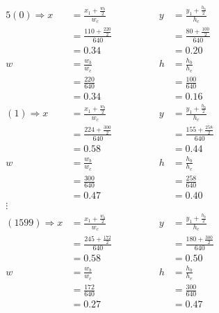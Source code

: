     \begin{alignat*}{5}
        (0) \Rightarrow x       &= \frac{x_1 + \frac{w_b}{2}}{w_c} \qquad\qquad &y  &=\frac{y_1 + \frac{h_b}{2}}{h_c}\\
                                &= \frac{110 + \frac{220}{2}}{640} \qquad\qquad &   &=\frac{80 + \frac{100}{2}}{640}\\
                                &= 0.34 \qquad\qquad                            &   &= 0.20\\
        w                       &= \frac{w_b}{w_c}\qquad\qquad                  &h  &= \frac{h_b}{h_c}\\
                                &= \frac{220}{640}\qquad\qquad                  &   &= \frac{100}{640}\\
                                &= 0.34\qquad\qquad                             &   &= 0.16\\
        (1) \Rightarrow x       &= \frac{x_1 + \frac{w_b}{2}}{w_c}\qquad\qquad  &y  &=\frac{y_1 + \frac{h_b}{2}}{h_c}\\
                                &= \frac{224 + \frac{300}{2}}{640}\qquad\qquad  &   &= \frac{155 + \frac{258}{2}}{640}\\
                                &= 0.58\qquad\qquad                             &   &= 0.44\\
        w                       &= \frac{w_b}{w_c}\qquad\qquad                  &h  &= \frac{h_b}{h_c}\\
                                &= \frac{300}{640}\qquad\qquad                  &   &= \frac{258}{640}\\
                                &= 0.47\qquad\qquad                             &   &= 0.40\\
        \vdots \\
        (1599) \Rightarrow x    &= \frac{x_1 + \frac{w_b}{2}}{w_c}\qquad\qquad  &y  &=\frac{y_1 + \frac{h_b}{2}}{h_c}\\
                                &= \frac{245 + \frac{172}{2}}{640}\qquad\qquad  &   &= \frac{180 + \frac{300}{2}}{640}\\
                                &= 0.58\qquad\qquad                             &   &= 0.50\\
        w                       &= \frac{w_b}{w_c}\qquad\qquad                  &h  &= \frac{h_b}{h_c}\\
                                &= \frac{172}{640}\qquad\qquad                  &   &= \frac{300}{640}\\
                                &= 0.27\qquad\qquad                             &   &= 0.47\\
    \end{alignat*}

